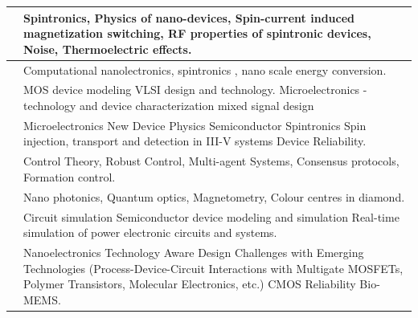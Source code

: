 \documentclass[openany]{book} %
\begin{document}
\begin{tabular}{p{4.5cm} p{9cm}}
\hline
\href{https://www.ee.iitb.ac.in/web/people/faculty/home/ashwin}{\color{blue}{Prof. Ashwin A. Tulapurkar}} & Spintronics, Physics of nano-devices, Spin-current induced magnetization switching, RF properties of spintronic devices, Noise, Thermoelectric effects.\\
\hline

\href{https://www.ee.iitb.ac.in/web/people/faculty/home/bm}{\color{blue}{Prof. Bhaskaran Muralidharan}} & Computational nanolectronics, spintronics , nano scale energy conversion.\\
\hline

\href{https://www.ee.iitb.ac.in/wiki/faculty/dinesh}{\color{blue}{Prof. Dinesh K. Sharma}} & MOS device modeling VLSI design and technology. Microelectronics - technology and device characterization mixed signal design \\
\hline

\href{https://www.ee.iitb.ac.in/web/people/faculty/home/dsaha}{\color{blue}{Prof. Dipankar Saha}} & Microelectronics New Device Physics Semiconductor Spintronics Spin injection, transport and detection in III-V systems Device Reliability.\\
\hline

\href{https://www.ee.iitb.ac.in/web/people/faculty/home/dm}{\color{blue}{Prof. Dwaipayan Mukherjee}} & Control Theory, Robust Control, Multi-agent Systems, Consensus protocols, Formation control.\\
\hline


\href{https://www.ee.iitb.ac.in/web/people/faculty/home/kasturis}{\color{blue}{Prof. Kasturi Saha}} & Nano photonics, Quantum optics, Magnetometry, Colour centres in diamond.\\
\hline

\href{https://www.ee.iitb.ac.in/web/people/faculty/home/mbpatil}{\color{blue}{Prof. Mahesh B. Patil}} & Circuit simulation Semiconductor device modeling and simulation Real-time simulation of power electronic circuits and systems.\\
\hline

\href{https://www.ee.iitb.ac.in/~rrao/}{\color{blue}{Prof. Valipe Ramgopal Rao}} & Nanoelectronics Technology Aware Design Challenges with Emerging Technologies (Process-Device-Circuit Interactions with Multigate MOSFETs, Polymer Transistors, Molecular Electronics, etc.) CMOS Reliability Bio-MEMS.\\
\hline


\end{tabular}
\end{document}
